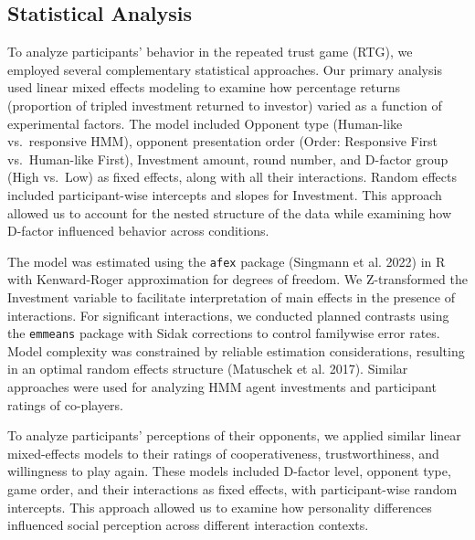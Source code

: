 \documentclass[
]{article}
\begin{document}
\subsection{Statistical Analysis}\label{statistical-analysis}

To analyze participants' behavior in the repeated trust game (RTG), we employed several complementary statistical approaches. Our primary analysis used linear mixed effects modeling to examine how percentage returns (proportion of tripled investment returned to investor) varied as a function of experimental factors. The model included Opponent type (Human-like vs.~responsive HMM), opponent presentation order (Order: Responsive First vs.~Human-like First), Investment amount, round number, and D-factor group (High vs.~Low) as fixed effects, along with all their interactions. Random effects included participant-wise intercepts and slopes for Investment. This approach allowed us to account for the nested structure of the data while examining how D-factor influenced behavior across conditions.

The model was estimated using the \texttt{afex} package (Singmann et al. 2022) in R with Kenward-Roger approximation for degrees of freedom. We Z-transformed the Investment variable to facilitate interpretation of main effects in the presence of interactions. For significant interactions, we conducted planned contrasts using the \texttt{emmeans} package with Sidak corrections to control familywise error rates. Model complexity was constrained by reliable estimation considerations, resulting in an optimal random effects structure (Matuschek et al. 2017). Similar approaches were used for analyzing HMM agent investments and participant ratings of co-players.

To analyze participants' perceptions of their opponents, we applied similar linear mixed-effects models to their ratings of cooperativeness, trustworthiness, and willingness to play again. These models included D-factor level, opponent type, game order, and their interactions as fixed effects, with participant-wise random intercepts. This approach allowed us to examine how personality differences influenced social perception across different interaction contexts.
\end{document}
